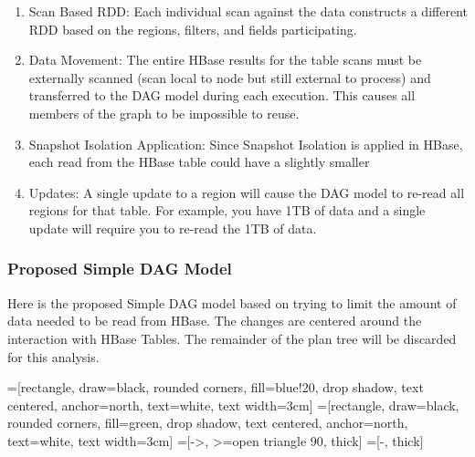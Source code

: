 \begin{enumerate}
	\item Scan Based RDD: Each individual scan against the data constructs a
	different RDD based on the regions, filters, and fields participating.
	\item Data Movement: The entire HBase results for the table scans must be
	externally scanned (scan local to node but still external to process) and
	transferred to the DAG model during each execution.  This causes all members of
	the graph to be impossible to reuse.
	\item Snapshot Isolation Application: Since Snapshot Isolation is applied in
	HBase, each read from the HBase table could have a slightly smaller 
	\item Updates:  A single update to a region will cause the DAG model to re-read
	all regions for that table.  For example, you have 1TB of data and a single
	update will require you to re-read the 1TB of data.
\end{enumerate}

\subsubsection{Proposed Simple DAG Model}
Here is the proposed Simple DAG model based on trying to limit the amount of
data needed to be read from HBase.  The changes are centered around the
interaction with HBase Tables.  The remainder of the plan tree will be discarded
for this analysis.

=[rectangle, draw=black, rounded corners, fill=blue!20, drop
shadow, text centered, anchor=north, text=white, text width=3cm]
=[rectangle, draw=black, rounded corners, fill=green, drop shadow,
        text centered, anchor=north, text=white, text width=3cm]
=[->, >=open triangle 90, thick]
=[-, thick]
        
\begin{center}
\end{center}

